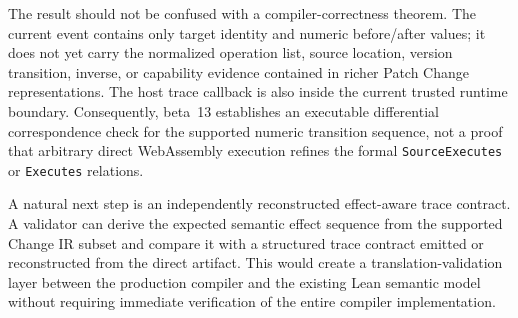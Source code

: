 The result should not be confused with a compiler-correctness theorem. The current event contains only target identity and numeric before/after values; it does not yet carry the normalized operation list, source location, version transition, inverse, or capability evidence contained in richer Patch Change representations. The host trace callback is also inside the current trusted runtime boundary. Consequently, beta~13 establishes an executable differential correspondence check for the supported numeric transition sequence, not a proof that arbitrary direct WebAssembly execution refines the formal \texttt{SourceExecutes} or \texttt{Executes} relations.

A natural next step is an independently reconstructed effect-aware trace contract. A validator can derive the expected semantic effect sequence from the supported Change IR subset and compare it with a structured trace contract emitted or reconstructed from the direct artifact. This would create a translation-validation layer between the production compiler and the existing Lean semantic model without requiring immediate verification of the entire compiler implementation.
